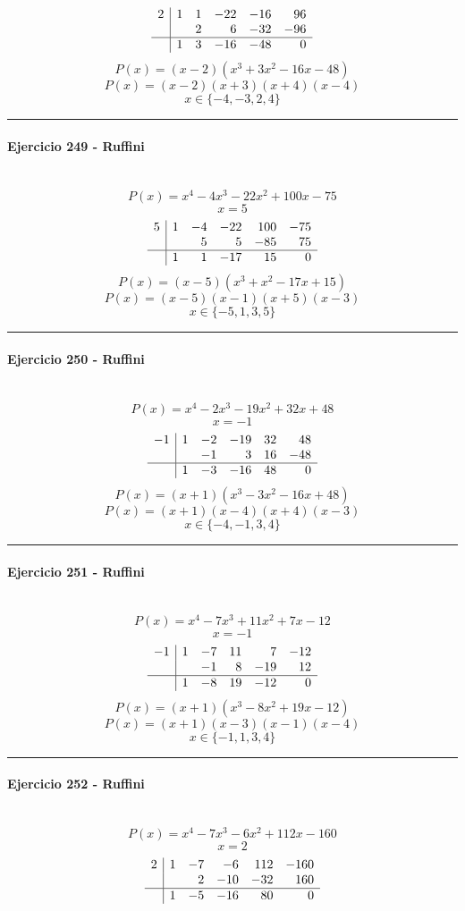 \documentclass[10pt,a4paper]{article}
\newcommand{\res}[1]{\paragraph{#1}\mbox{}\\[-1.2em]}
\begin{document}
\[\begin{array}{r|rrrrr}2 & 1 & 1 & -22 & -16 & 96\\  &  & 2 & 6 & -32 & -96\\\hline  & 1 & 3 & -16 & -48 & 0\end{array}\]
\[ P(x)=(x-2)(x^{3} + 3 x^{2} - 16 x - 48) \]
\[ P(x)=(x-2)(x+3)(x+4)(x-4) \]
\[ \boxed{x\in\{-4,-3,2,4\}} \]
\vspace{1mm}\hrule\vspace{2mm}
\res{Ejercicio 249 - Ruffini}
\[ P(x)=x^{4} - 4 x^{3} - 22 x^{2} + 100 x - 75 \]
\[ x=5 \]
\[\begin{array}{r|rrrrr}5 & 1 & -4 & -22 & 100 & -75\\  &  & 5 & 5 & -85 & 75\\\hline  & 1 & 1 & -17 & 15 & 0\end{array}\]
\[ P(x)=(x-5)(x^{3} + x^{2} - 17 x + 15) \]
\[ P(x)=(x-5)(x-1)(x+5)(x-3) \]
\[ \boxed{x\in\{-5,1,3,5\}} \]
\vspace{1mm}\hrule\vspace{2mm}
\res{Ejercicio 250 - Ruffini}
\[ P(x)=x^{4} - 2 x^{3} - 19 x^{2} + 32 x + 48 \]
\[ x=-1 \]
\[\begin{array}{r|rrrrr}-1 & 1 & -2 & -19 & 32 & 48\\  &  & -1 & 3 & 16 & -48\\\hline  & 1 & -3 & -16 & 48 & 0\end{array}\]
\[ P(x)=(x+1)(x^{3} - 3 x^{2} - 16 x + 48) \]
\[ P(x)=(x+1)(x-4)(x+4)(x-3) \]
\[ \boxed{x\in\{-4,-1,3,4\}} \]
\vspace{1mm}\hrule\vspace{2mm}
\res{Ejercicio 251 - Ruffini}
\[ P(x)=x^{4} - 7 x^{3} + 11 x^{2} + 7 x - 12 \]
\[ x=-1 \]
\[\begin{array}{r|rrrrr}-1 & 1 & -7 & 11 & 7 & -12\\  &  & -1 & 8 & -19 & 12\\\hline  & 1 & -8 & 19 & -12 & 0\end{array}\]
\[ P(x)=(x+1)(x^{3} - 8 x^{2} + 19 x - 12) \]
\[ P(x)=(x+1)(x-3)(x-1)(x-4) \]
\[ \boxed{x\in\{-1,1,3,4\}} \]
\vspace{1mm}\hrule\vspace{2mm}
\res{Ejercicio 252 - Ruffini}
\[ P(x)=x^{4} - 7 x^{3} - 6 x^{2} + 112 x - 160 \]
\[ x=2 \]
\[\begin{array}{r|rrrrr}2 & 1 & -7 & -6 & 112 & -160\\  &  & 2 & -10 & -32 & 160\\\hline  & 1 & -5 & -16 & 80 & 0\end{array}\]
\end{document}
